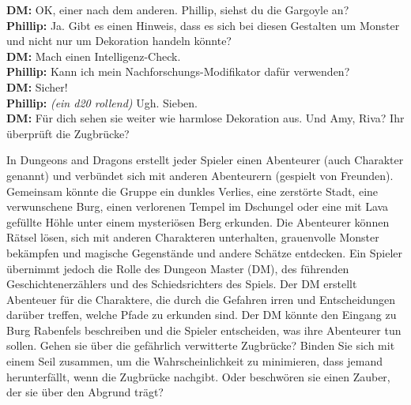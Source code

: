 \begin{quotebox}
\textbf{DM:} OK, einer nach dem anderen. Phillip, siehst du die Gargoyle an?\\
\textbf{Phillip:}
Ja. Gibt es einen Hinweis, dass es sich bei diesen Gestalten um Monster und nicht nur um Dekoration handeln könnte?\\
\textbf{DM:}
Mach einen Intelligenz-Check.\\
\textbf{Phillip:}
Kann ich mein Nachforschungs-Modifikator dafür verwenden?\\
\textbf{DM:}
Sicher!\\
\textbf{Phillip:} \textit{(ein d20 rollend)}
Ugh. Sieben.\\
\textbf{DM:}
Für dich sehen sie weiter wie harmlose Dekoration aus. Und Amy, Riva? Ihr überprüft die Zugbrücke?
\end{quotebox}

In Dungeons and Dragons erstellt jeder Spieler einen Abenteurer (auch Charakter genannt) und verbündet sich mit anderen Abenteurern (gespielt von Freunden). Gemeinsam könnte die Gruppe ein dunkles Verlies, eine zerstörte Stadt, eine verwunschene Burg, einen verlorenen Tempel im Dschungel oder eine mit Lava gefüllte Höhle unter einem mysteriösen Berg erkunden. Die Abenteurer können Rätsel lösen, sich mit anderen Charakteren unterhalten, grauenvolle Monster bekämpfen und magische Gegenstände und andere Schätze entdecken. Ein Spieler übernimmt jedoch die Rolle des Dungeon Master (DM), des führenden Geschichtenerzählers und des Schiedsrichters des Spiels. Der DM erstellt Abenteuer für die Charaktere, die durch die Gefahren irren und Entscheidungen darüber treffen, welche Pfade zu erkunden sind. Der DM könnte den Eingang zu Burg Rabenfels beschreiben und die Spieler entscheiden, was ihre Abenteurer tun sollen. Gehen sie über die gefährlich verwitterte Zugbrücke? Binden Sie sich mit einem Seil zusammen, um die Wahrscheinlichkeit zu minimieren, dass jemand herunterfällt, wenn die Zugbrücke nachgibt. Oder beschwören sie einen Zauber, der sie über den Abgrund trägt? \\

